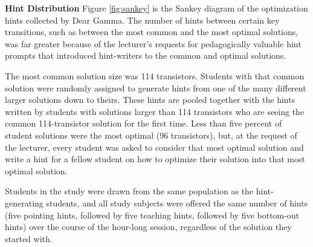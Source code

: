 {\bf Hint Distribution} Figure \ref{fig:sankey} is the Sankey diagram of the optimization hints collected by Dear Gamma. The number of hints between certain key transitions, such as between the most common and the most optimal solutions, was far greater because of the lecturer's requests for pedagogically valuable hint prompts that introduced hint-writers to the common and optimal solutions. 

The most common solution size was 114 transistors. Students with that common solution were randomly assigned to generate hints from one of the many different larger solutions down to theirs. These hints are pooled together with the hints written by students with solutions larger than 114 transistors who are seeing the common 114-transistor solution for the first time. Less than five percent of student solutions were the most optimal (96 transistors), but, at the request of the lecturer, every student was asked to consider that most optimal solution and write a hint for a fellow student on how to optimize their solution into that most optimal solution.

Students in the study were drawn from the same population as the hint-generating students, and all study subjects were offered the same number of hints (five pointing hints, followed by five teaching hints, followed by five bottom-out hints) over the course of the hour-long session, regardless of the solution they started with. 

